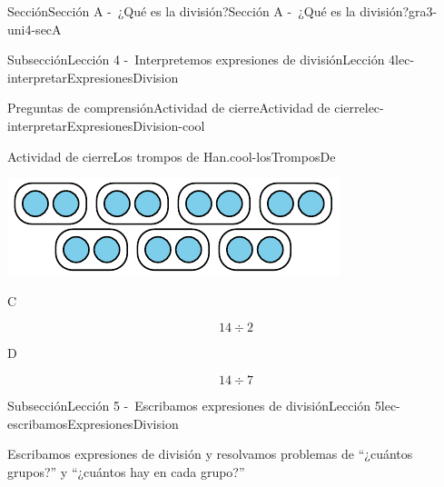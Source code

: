 \documentclass[twoside,10pt,]{article}
\begin{document}
\begin{sectionptx}{Sección}{Sección A -~¿Qué es la división?}{}{Sección A -~¿Qué es la división?}{}{}{gra3-uni4-secA}
\begin{subsectionptx}{Subsección}{Lección 4 -~Interpretemos expresiones de división}{}{Lección 4}{}{}{lec-interpretarExpresionesDivision}
\begin{reading-questions-subsubsection}{Preguntas de comprensión}{Actividad de cierre}{}{Actividad de cierre}{}{}{lec-interpretarExpresionesDivision-cool}
\begin{project}{Actividad de cierre}{Los trompos de Han.}{cool-losTromposDe}
\begin{sidebyside}{4}{0.0075}{0.0075}{0.015}
\begin{sbspanel}{0.43}%
\includegraphics[width=\linewidth]{external/svg-source/tikz-file-151101.pdf}
\end{sbspanel}%
\end{sidebyside}%
\begin{sidebyside}{4}{0.0075}{0.0075}{0.015}%
\begin{sbspanel}{0.04}%
C%
\end{sbspanel}%
\begin{sbspanel}{0.43}%
\par
%
\begin{equation*}
14\div 2
\end{equation*}
%
\end{sbspanel}%
\begin{sbspanel}{0.04}%
\par
D%
\end{sbspanel}%
\begin{sbspanel}{0.43}%
\par
%
\begin{equation*}
14\div 7
\end{equation*}
%
\end{sbspanel}%
\end{sidebyside}%
\end{project}%
\end{reading-questions-subsubsection}
\end{subsectionptx}
%
%
\typeout{************************************************}
\typeout{************************************************}
%
\begin{subsectionptx}{Subsección}{Lección 5 -~Escribamos expresiones de división}{}{Lección 5}{}{}{lec-escribamosExpresionesDivision}
\begin{introduction}{}%
Escribamos expresiones de división y resolvamos problemas de “¿cuántos grupos?” y “¿cuántos hay en cada grupo?”%
\end{introduction}%
%
%
\typeout{************************************************}
\typeout{************************************************}

\end{subsectionptx}
\end{sectionptx}
\end{document}
